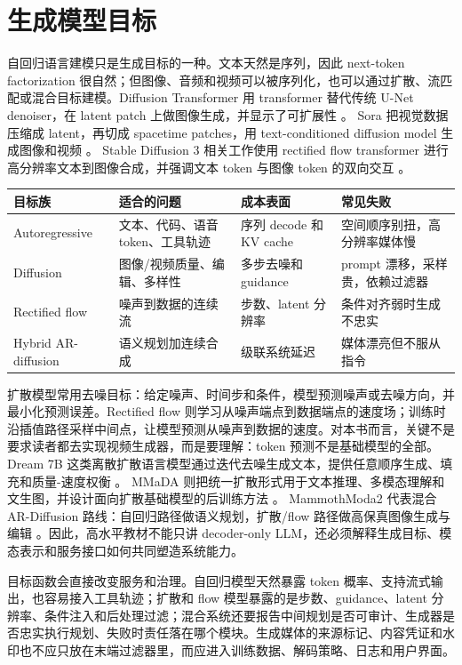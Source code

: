\documentclass[UTF8,zihao=-4,openany]{ctexbook}
\begin{document}
\section{生成模型目标}
自回归语言建模只是生成目标的一种。文本天然是序列，因此 next-token factorization 很自然；但图像、音频和视频可以被序列化，也可以通过扩散、流匹配或混合目标建模。Diffusion Transformer 用 transformer 替代传统 U-Net denoiser，在 latent patch 上做图像生成，并显示了可扩展性 \cite{peebles2023dit}。 Sora 把视觉数据压缩成 latent，再切成 spacetime patches，用 text-conditioned diffusion model 生成图像和视频 \cite{openai2024sora}。 Stable Diffusion 3 相关工作使用 rectified flow transformer 进行高分辨率文本到图像合成，并强调文本 token 与图像 token 的双向交互 \cite{esser2024rectifiedflow}。

\begin{center}
\begin{tabular}{@{}p{}p{}p{}p{}@{}}
\toprule
目标族 & 适合的问题 & 成本表面 & 常见失败 \\
\midrule
Autoregressive & 文本、代码、语音 token、工具轨迹 & 序列 decode 和 KV cache & 空间顺序别扭，高分辨率媒体慢 \\
Diffusion & 图像/视频质量、编辑、多样性 & 多步去噪和 guidance & prompt 漂移，采样贵，依赖过滤器 \\
Rectified flow & 噪声到数据的连续流 & 步数、latent 分辨率 & 条件对齐弱时生成不忠实 \\
Hybrid AR-diffusion & 语义规划加连续合成 & 级联系统延迟 & 媒体漂亮但不服从指令 \\
\bottomrule
\end{tabular}
\end{center}

扩散模型常用去噪目标：给定噪声、时间步和条件，模型预测噪声或去噪方向，并最小化预测误差。Rectified flow 则学习从噪声端点到数据端点的速度场；训练时沿插值路径采样中间点，让模型预测从噪声到数据的速度。对本书而言，关键不是要求读者都去实现视频生成器，而是要理解：token 预测不是基础模型的全部。Dream 7B 这类离散扩散语言模型通过迭代去噪生成文本，提供任意顺序生成、填充和质量-速度权衡 \cite{ye2025dream7b}。 MMaDA 则把统一扩散形式用于文本推理、多模态理解和文生图，并设计面向扩散基础模型的后训练方法 \cite{yang2025mmada}。 MammothModa2 代表混合 AR-Diffusion 路线：自回归路径做语义规划，扩散/flow 路径做高保真图像生成与编辑 \cite{shen2025mammothmoda2}。因此，高水平教材不能只讲 decoder-only LLM，还必须解释生成目标、模态表示和服务接口如何共同塑造系统能力。

目标函数会直接改变服务和治理。自回归模型天然暴露 token 概率、支持流式输出，也容易接入工具轨迹；扩散和 flow 模型暴露的是步数、guidance、latent 分辨率、条件注入和后处理过滤；混合系统还要报告中间规划是否可审计、生成器是否忠实执行规划、失败时责任落在哪个模块。生成媒体的来源标记、内容凭证和水印也不应只放在末端过滤器里，而应进入训练数据、解码策略、日志和用户界面。
\end{document}
